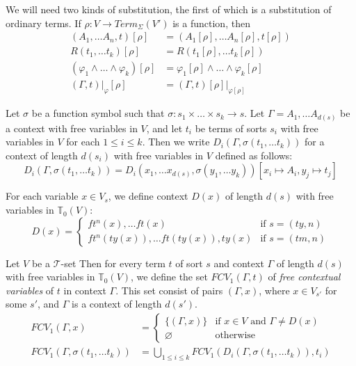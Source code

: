 \documentclass[reqno]{amsart}
\theoremstyle{definition}
\theoremstyle{remark}
\numberwithin{figure}{section}
\begin{document}
We will need two kinds of substitution, the first of which is a substitution of ordinary terms.
If  $\rho : V \to Term_\Sigma(V')$ is a function, then
\begin{align*}
(A_1, \ldots A_n, t)[\rho] & = (A_1[\rho], \ldots A_n[\rho], t[\rho]) \\
R(t_1, \ldots t_k)[\rho] & = R(t_1[\rho], \ldots t_k[\rho]) \\
(\varphi_1 \land \ldots \land \varphi_k)[\rho] & = \varphi_1[\rho] \land \ldots \land \varphi_k[\rho] \\
(\Gamma,t)|_\varphi[\rho] & = (\Gamma,t)[\rho]|_{\varphi[\rho]}
\end{align*}

Let $\sigma$ be a function symbol such that $\sigma : s_1 \times \ldots \times s_k \to s$.
Let $\Gamma = A_1, \ldots A_{d(s)}$ be a context with free variables in $V$, and let $t_i$ be terms of sorts $s_i$ with free variables in $V$ for each $1 \leq i \leq k$.
Then we write $D_i(\Gamma, \sigma(t_1, \ldots t_k))$ for a context of length $d(s_i)$ with free variables in $V$ defined as follows:
\[ D_i(\Gamma, \sigma(t_1, \ldots t_k)) = D_i(x_1, \ldots x_{d(s)}, \sigma(y_1, \ldots y_k))[x_i \mapsto A_i, y_j \mapsto t_j] \]

For each variable $x \in V_s$, we define context $D(x)$ of length $d(s)$ with free variables in $\mathbb{T}_0(V)$:
\[ D(x) = 
  \begin{cases}
      ft^n(x), \ldots ft(x) & \text{if } s = (ty,n) \\
      ft^n(ty(x)), \ldots ft(ty(x)), ty(x) & \text{if } s = (tm,n)
  \end{cases}
\]

Let $V$ be a $\mathcal{T}$-set
Then for every term $t$ of sort $s$ and context $\Gamma$ of length $d(s)$ with free variables in $\mathbb{T}_0(V)$,
    we define the set $FCV_1(\Gamma,t)$ of \emph{free contextual variables} of $t$ in context $\Gamma$.
This set consist of pairs $(\Gamma,x)$, where $x \in V_{s'}$ for some $s'$, and $\Gamma$ is a context of length $d(s')$.
\begin{align*}
FCV_1(\Gamma,x) & =
    \begin{cases}
        \{ (\Gamma,x) \} & \text{if } x \in V \text{ and } \Gamma \neq D(x) \\
        \varnothing & \text{otherwise}
    \end{cases} \\
FCV_1(\Gamma, \sigma(t_1, \ldots t_k)) & = \bigcup_{1 \leq i \leq k} FCV_1(D_i(\Gamma,\sigma(t_1, \ldots t_k)), t_i)
\end{align*}
\end{document}
